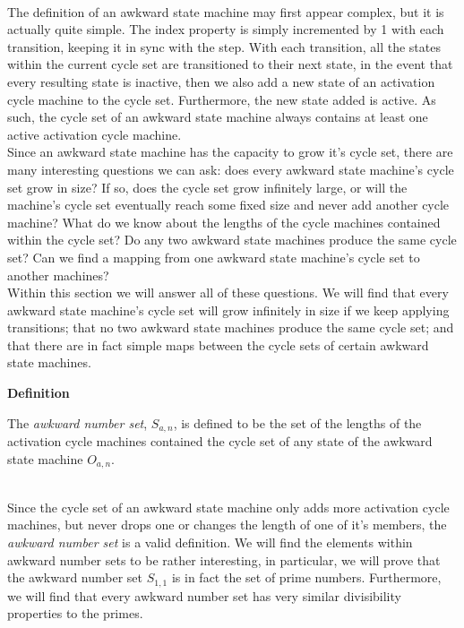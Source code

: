 \documentclass[a4paper,12pt]{article}
\begin{document}
\noindent \\ The definition of an awkward state machine may first appear complex, but it is actually quite simple. The index property is simply incremented by 1 with each transition, keeping it in sync with the step. With each transition, all the states within the current cycle set are transitioned to their next state, in the event that every resulting state is inactive, then we also add a new state of an activation cycle machine to the cycle set. Furthermore, the new state added is active. As such, the cycle set of an awkward state machine always contains at least one active activation cycle machine.\\

\noindent Since an awkward state machine has the capacity to grow it's cycle set, there are many interesting questions we can ask: does every awkward state machine's cycle set grow in size? If so, does the cycle set grow infinitely large, or will the machine's cycle set eventually reach some fixed size and never add another cycle machine? What do we know about the lengths of the cycle machines contained within the cycle set? Do any two awkward state machines produce the same cycle set? Can we find a mapping from one awkward state machine's cycle set to another machines?\\


\noindent Within this section we will answer all of these questions. We will find that every awkward state machine's cycle set will grow infinitely in size if we keep applying transitions; that no two awkward state machines produce the same cycle set; and that there are in fact simple maps between the cycle sets of certain awkward state machines.\\



\label{definition:awkward_number_set}
\hypertarget{definition:awkward_number_set}{}
\begin{tcolorbox}
\textbf{Definition}

\noindent The \textit{awkward number set}, $S_{a, n}$, is defined to be the set of the lengths of the activation cycle machines contained the cycle set of any state of the awkward state machine $O_{a, n}$.
\end{tcolorbox}





\noindent \\ Since the cycle set of an awkward state machine only adds more activation cycle machines, but never drops one or changes the length of one of it's members, the \textit{awkward number set} is a valid definition. We will find the elements within awkward number sets to be rather interesting, in particular, we will prove that the awkward number set $S_{1, 1}$ is in fact the set of prime numbers. Furthermore, we will find that every awkward number set has very similar divisibility properties to the primes.\\
\end{document}
